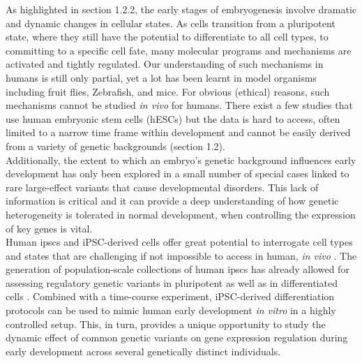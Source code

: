 As highlighted in section 
1.2.2,
the early stages of embryogenesis involve dramatic and dynamic changes in cellular states. 
As cells transition from a pluripotent state, where they still have the potential to differentiate to all cell types, to committing to a specific cell fate, many molecular programs and mechanisms are activated and tightly regulated.
Our understanding of such mechanisms in humans is still only partial, yet a lot has been learnt in model organisms including fruit flies, Zebrafish, and mice.
For obvious (ethical) reasons, such mechanisms cannot be studied \textit{in vivo} for humans. 
There exist a few studies that use human embryonic stem cells (hESCs) but the data is hard to access, often limited to a narrow time frame within development and cannot be easily derived from a variety of genetic backgrounds 
(section 
1.2). \\

Additionally, the extent to which an embryo’s genetic background influences early development has only been explored in a small number of special cases linked to rare large-effect variants that cause developmental disorders. 
This lack of information is critical and it can provide a deep understanding of how genetic heterogeneity is tolerated in normal development, when controlling the expression of key genes is vital.\\

Human \gls{ipsc}s and iPSC-derived cells offer great potential to interrogate cell types and states that are challenging if not impossible to access in human, \textit{in vivo} \cite{kilpinen2017common}.
The generation of population-scale collections of human \gls{ipsc}s \cite{kilpinen2017common, carcamo2017analysis} has already allowed for assessing regulatory genetic variants in pluripotent \cite{kilpinen2017common, carcamo2017analysis} as well as in differentiated cells \cite{schwartzentruber2018molecular, alasoo2018shared, pashos2017large}.
Combined with a time-course experiment, iPSC-derived differentiation protocols can be used to mimic human early development \textit{in vitro} in a highly controlled setup. This, in turn, provides a unique opportunity to study the dynamic effect of common genetic variants on gene expression regulation during early development across several genetically distinct individuals.

